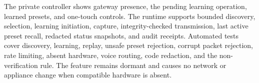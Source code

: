 The private controller shows gateway presence, the pending learning operation,
learned presets, and one-touch controls.  The runtime supports bounded discovery,
selection, learning initiation, capture, integrity-checked transmission, last
active preset recall, redacted status snapshots, and audit receipts.  Automated
tests cover discovery, learning, replay, unsafe preset rejection, corrupt packet
rejection, rate limiting, absent hardware, voice routing, code redaction, and the
non-verification rule.  The feature remains dormant and causes no network or
appliance change when compatible hardware is absent.
